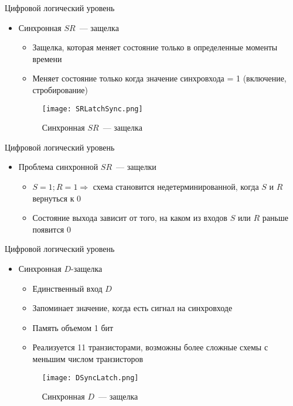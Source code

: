 \documentclass[aspectratio=169,14pt]{beamer}
\begin{document}
\begin{frame}{Цифровой логический уровень}
    \begin{itemize}
        \item Синхронная $SR$~--- защелка
        \begin{itemize}
            \item Защелка, которая меняет состояние только в определенные моменты времени
            \item Меняет состояние только когда значение синхровхода = 1 (включение, стробирование)
        \end{itemize}
        \begin{figure}[htp]
            \centering
            \texttt{[image: SRLatchSync.png]}
            \caption{\tiny{Синхронная $SR$~--- защелка}}
        \end{figure}
    \end{itemize}
\end{frame}

\begin{frame}{Цифровой логический уровень}
    \begin{itemize}
        \item Проблема синхронной $SR$~--- защелки
        \begin{itemize}
            \item $S=1; R=1 \Rightarrow$ схема становится недетерминированной,
            когда $S$ и $R$ вернуться к 0
            \item Состояние выхода зависит от того, на каком из входов $S$ или $R$
            раньше появится 0
        \end{itemize}
    \end{itemize}
\end{frame}

\begin{frame}{Цифровой логический уровень}
    \begin{itemize}
        \item Синхронная $D$-защелка
        \begin{itemize}
            \item Единственный вход $D$
            \item Запоминает значение, когда есть сигнал на синхровходе
            \item Память объемом 1 бит
            \item Реализуется 11 транзисторами, возможны более сложные
            схемы с меньшим числом транзисторов
        \end{itemize}
        \begin{figure}[htp]
            \centering
            \texttt{[image: DSyncLatch.png]}
            \caption{\tiny{Синхронная $D$~--- защелка}}
        \end{figure}
    \end{itemize}
\end{frame}
\end{document}
